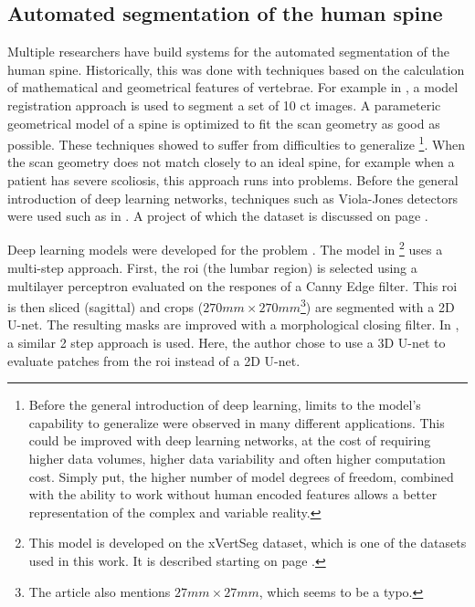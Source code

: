 \subsection{Automated segmentation of the human spine}
\par{
    Multiple researchers have build systems for the automated segmentation of the human spine.
    Historically, this was done with techniques based on the calculation of mathematical and geometrical features of vertebrae. 
    For example in \cite{Klinder2008}, a model registration approach is used to segment a set of 10 \acrshort{ct} images.
    A parameteric geometrical model of a spine is optimized to fit the scan geometry as good as possible.
    These techniques showed to suffer from difficulties to generalize
    \footnote{Before the general introduction of deep learning, limits to the model's capability to generalize were observed in many different applications.
    This could be improved with deep learning networks, at the cost of requiring higher data volumes, higher data variability and often higher computation cost.
    Simply put, the higher number of model degrees of freedom, combined with the ability to work without human encoded features allows a better representation of the complex and variable reality.}. 
    When the scan geometry does not match closely to an ideal spine, for example when a patient has severe scoliosis, this approach runs into problems.
    Before the general introduction of deep learning networks, techniques such as Viola-Jones detectors were used such as in \cite{Zukic2014}. 
    A project of which the dataset is discussed on page \pageref{sec:DataUSiegen}.
}
\par{
    Deep learning models were developed for the problem \cite{Sekuboyina2017, Janssens2018, Chuang2019, Lessmann2018}.
    The model in \cite{Sekuboyina2017}\footnote{This model is developed on the xVertSeg dataset, which is one of the datasets used in this work. It is described starting on page \pageref{sec:xVertSeg}.} 
    uses a multi-step approach. First, the \acrfull{roi} (the lumbar region) is selected using a multilayer perceptron evaluated on the respones of a Canny Edge filter.
    This \acrshort{roi} is then sliced (sagittal) and crops ($270mm \times 270mm$\footnote{The article also mentions $27mm \times 27mm$, which seems to be a typo.}) are segmented with a 2D U-net. 
    The resulting masks are improved with a morphological closing filter. 
    In \cite{Janssens2018}, a similar 2 step approach is used. Here, the author chose to use a 3D U-net to evaluate patches from the \acrshort{roi} instead of a 2D U-net.
}

